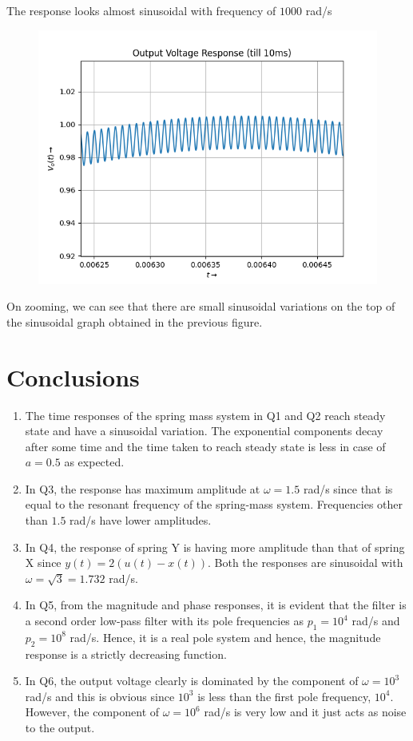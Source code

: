 \documentclass[12pt, a4paper]{article}
\begin{document}
\begin{center}
    The response looks almost sinusoidal with frequency of $1000$ rad/s
\end{center}
\vspace*{-0.5cm}
\begin{figure}[H]
    \centering
    \includegraphics[scale = 0.8]{Figure_11_2.png}
    \label{fig:sample}
\end{figure}
\begin{center}
    On zooming, we can see that there are small sinusoidal variations on the top of the sinusoidal graph obtained in the previous figure.
\end{center}
\section{Conclusions}
\begin{enumerate}
    \item The time responses of the spring mass system in Q1 and Q2 reach steady state and have a sinusoidal variation. The exponential components decay after some time and the time taken to reach steady state is less in case of $a=0.5$ as expected.
    \item In Q3, the response has maximum amplitude at $\omega = 1.5$ rad/s since that is equal to the resonant frequency of the spring-mass system. Frequencies other than $1.5$ rad/s have lower amplitudes.
    \item In Q4, the response of spring Y is having more amplitude than that of spring X since $y(t)=2(u(t)-x(t))$. Both the responses are sinusoidal with $\omega = \sqrt{3} = 1.732$ rad/s.
    \item In Q5, from the magnitude and phase responses, it is evident that the filter is a second order low-pass filter with its pole frequencies as $p_{1}=10^{4}$ rad/s and $p_{2}=10^{8}$ rad/s. Hence, it is a real pole system and hence, the magnitude response is a strictly decreasing function.
    \item In Q6, the output voltage clearly is dominated by the component of $\omega = 10^{3}$ rad/s and this is obvious since $10^{3}$ is less than the first pole frequency, $10^{4}$. However, the component of $\omega = 10^{6}$ rad/s is very low and it just acts as noise to the output.
\end{enumerate}
\end{document}
